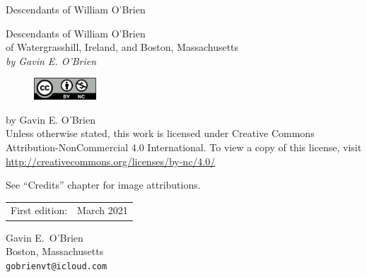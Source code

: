 \documentclass[11pt,oneside]{memoir}
\begin{document}
 	
\frontmatter
\pagestyle{empty}

{\begingroup
\centering
\vspace*{0.1\textheight}
{\Huge Descendants of William O'Brien}\\[\baselineskip]
\endgroup}
\cleardoublepage

{\begingroup%
	\centering
	\vspace*{0.1\textheight}
	{\Huge Descendants of William O'Brien}\\[\baselineskip]
	{\LARGE of Watergrasshill, Ireland, and Boston, Massachusetts}\\[\baselineskip]
	{\large\itshape by Gavin E. O'Brien}\\[\baselineskip]
	\vfill
	\endgroup}
\clearpage

\begingroup
\footnotesize
\parindent 0pt
\parskip \baselineskip
\begin{figure}
	\includegraphics[width=88px]{by-nc}
\end{figure}
 by Gavin E. O'Brien\\
Unless otherwise stated, this work is licensed under Creative Commons Attribution-NonCommercial 4.0 International. To view a copy of this license, visit \url{http://creativecommons.org/licenses/by-nc/4.0/}

See ``Credits'' chapter for image attributions.

\begin{center}
	\begin{tabular}{ll}
		First edition:  & March 2021 \\
	\end{tabular}
\end{center}

Gavin E.\ O'Brien\\
Boston, Massachusetts\\
\texttt{gobrienvt@icloud.com}

\vspace*{2\baselineskip}


\endgroup
\clearpage
\pagestyle{headings}

\tableofcontents



\cleardoublepage
{}

\end{document}
